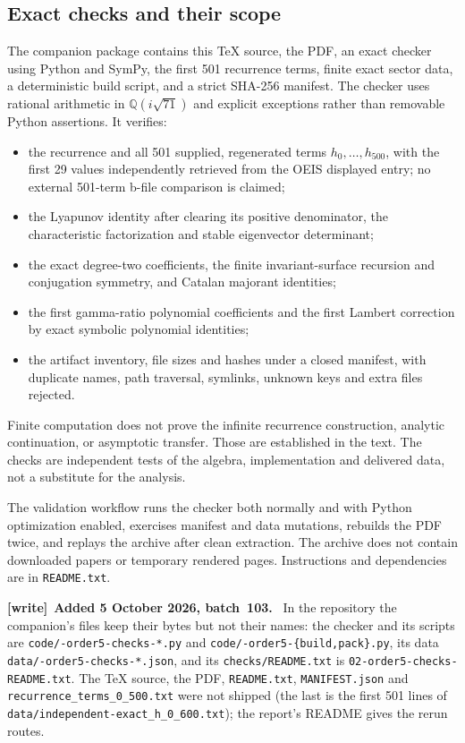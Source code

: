 \documentclass[11pt]{article}
\theoremstyle{remark}\newtheorem{remark}[theorem]{Remark}
\numberwithin{equation}{section}
\newenvironment{writenote}[1][]{\par\smallskip\begingroup\small
 \noindent\textbf{[write]}\if\relax\detokenize{#1}\relax\else~\textbf{#1.}\fi\ }%
 {\par\endgroup\smallskip}
\begin{document}
\subsection{Exact checks and their scope}
The companion package contains this TeX source, the PDF, an exact checker using Python and SymPy, the first 501 recurrence terms, finite exact sector data,
a deterministic build script, and a strict SHA-256 manifest.
The checker uses rational arithmetic in $\mathbb Q(i\sqrt{71})$ and
explicit exceptions rather than removable Python assertions. It verifies:
\begin{itemize}
\item the recurrence and all 501 supplied, regenerated terms
$h_0,\ldots,h_{500}$, with the first 29 values independently retrieved
from the OEIS displayed entry; no external 501-term b-file comparison
is claimed;
\item the Lyapunov identity after clearing its positive denominator,
the characteristic factorization and stable eigenvector determinant;
\item the exact degree-two coefficients, the finite invariant-surface
recursion and conjugation symmetry, and Catalan majorant identities;
\item the first gamma-ratio polynomial coefficients and the first
Lambert correction by exact symbolic polynomial identities;
\item the artifact inventory, file sizes and hashes under a closed manifest,
with duplicate names, path traversal, symlinks, unknown keys and extra
files rejected.
\end{itemize}
Finite computation does not prove the infinite recurrence construction,
analytic continuation, or asymptotic transfer. Those are established in
the text. The checks are independent tests of the algebra, implementation
and delivered data, not a substitute for the analysis.

The validation workflow runs the checker both normally and with Python
optimization enabled, exercises manifest and data mutations, rebuilds the
PDF twice, and replays the archive after clean extraction. The archive
does not contain downloaded papers or temporary rendered pages. Instructions and dependencies are in \texttt{README.txt}.
\begin{writenote}[Added 5 October 2026, batch~103]
\sloppy{}\relax In the repository the companion's files keep their bytes but not their names: the checker and its scripts are \texttt{code/-order5-checks-*.py} and \texttt{code/-order5-\{build,pack\}.py}, its data \texttt{data/-order5-checks-*.json}, and its \texttt{checks/\allowbreak README.txt} is \texttt{02-order5-\allowbreak checks-README.txt}. The TeX source, the PDF, \texttt{README.txt}, \texttt{MANIFEST.json} and \texttt{recurrence\_terms\_0\_500.txt} were not shipped (the last is the first 501 lines of \texttt{data/\allowbreak independent-exact\_h\_0\_600.txt}); the report's README gives the rerun routes.
\end{writenote}
\end{document}
